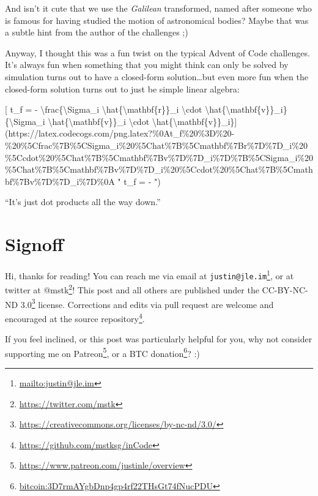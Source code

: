 \documentclass[]{article}
\renewcommand{\href}[2]{#2\footnote{\url{#1}}}
\begin{document}
And isn't it cute that we use the \emph{Galilean} transformed, named after
someone who is famous for having studied the motion of astronomical bodies?
Maybe that was a subtle hint from the author of the challenges ;)

Anyway, I thought this was a fun twist on the typical Advent of Code challenges.
It's always fun when something that you might think can only be solved by
simulation turns out to have a closed-form solution\ldots{}but even more fun
when the closed-form solution turns out to just be simple linear algebra:

{[} t\_f = - \textbackslash{}frac\{\textbackslash{}Sigma\_i
\textbackslash{}hat\{\textbackslash{}mathbf\{r\}\}\_i \textbackslash{}cdot
\textbackslash{}hat\{\textbackslash{}mathbf\{v\}\}\_i\}\{\textbackslash{}Sigma\_i
\textbackslash{}hat\{\textbackslash{}mathbf\{v\}\}\_i \textbackslash{}cdot
\textbackslash{}hat\{\textbackslash{}mathbf\{v\}\}\_i\}{]}(https://latex.codecogs.com/png.latex?\%0At\_f\%20\%3D\%20-\%20\%5Cfrac\%7B\%5CSigma\_i\%20\%5Chat\%7B\%5Cmathbf\%7Br\%7D\%7D\_i\%20\%5Ccdot\%20\%5Chat\%7B\%5Cmathbf\%7Bv\%7D\%7D\_i\%7D\%7B\%5CSigma\_i\%20\%5Chat\%7B\%5Cmathbf\%7Bv\%7D\%7D\_i\%20\%5Ccdot\%20\%5Chat\%7B\%5Cmathbf\%7Bv\%7D\%7D\_i\%7D\%0A
" t\_f = -
")

``It's just dot products all the way down.''

\hypertarget{signoff}{%
\section{Signoff}\label{signoff}}

Hi, thanks for reading! You can reach me via email at
\href{mailto:justin@jle.im}{\nolinkurl{justin@jle.im}}, or at twitter at
\href{https://twitter.com/mstk}{@mstk}! This post and all others are published
under the \href{https://creativecommons.org/licenses/by-nc-nd/3.0/}{CC-BY-NC-ND
3.0} license. Corrections and edits via pull request are welcome and encouraged
at \href{https://github.com/mstksg/inCode}{the source repository}.

If you feel inclined, or this post was particularly helpful for you, why not
consider \href{https://www.patreon.com/justinle/overview}{supporting me on
Patreon}, or a \href{bitcoin:3D7rmAYgbDnp4gp4rf22THsGt74fNucPDU}{BTC donation}?
:)
\end{document}
